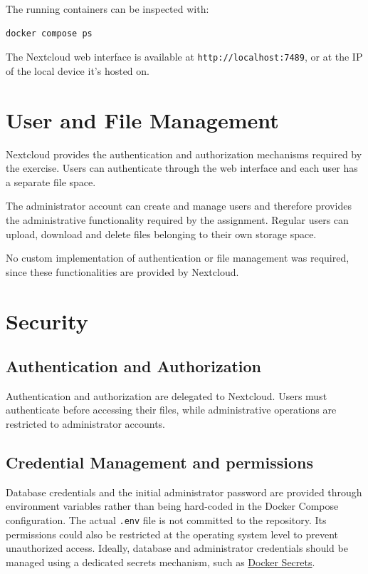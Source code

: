\documentclass[a4paper]{article}
\begin{document}
The running containers can be inspected with:

\begin{verbatim}
docker compose ps
\end{verbatim}

The Nextcloud web interface is available at
\texttt{http://localhost:7489}, or at the IP of the local device it's hosted on.

\section{User and File Management}

Nextcloud provides the authentication and authorization mechanisms
required by the exercise. Users can authenticate through the web
interface and each user has a separate file space.

The administrator account can create and manage users and therefore
provides the administrative functionality required by the assignment.
Regular users can upload, download and delete files belonging to their
own storage space.

No custom implementation of authentication or file management was
required, since these functionalities are provided by Nextcloud.

\section{Security}

\subsection{Authentication and Authorization}

Authentication and authorization are delegated to Nextcloud. Users
must authenticate before accessing their files, while administrative
operations are restricted to administrator accounts.

\subsection{Credential Management and permissions}

Database credentials and the initial administrator password are
provided through environment variables rather than being hard-coded
in the Docker Compose configuration. The actual \texttt{.env} file is
not committed to the repository. Its permissions could also be
restricted at the operating system level to prevent unauthorized
access. Ideally, database and administrator credentials should be
managed using a dedicated secrets mechanism, such as
\href{https://docs.docker.com/engine/swarm/secrets/}{Docker Secrets}.
\end{document}
